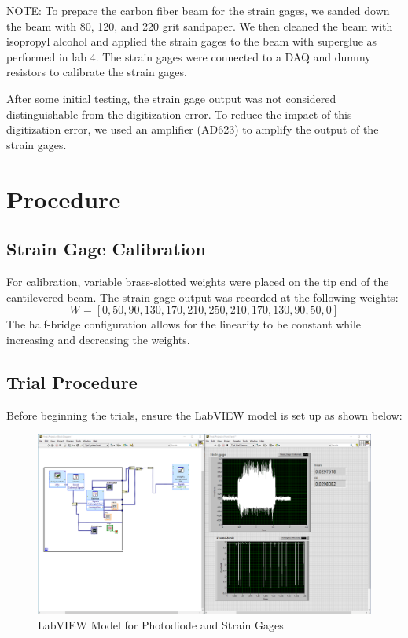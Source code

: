 \documentclass{article}
\begin{document}
\begin{enumerate}
\end{enumerate}

NOTE: To prepare the carbon fiber beam for the strain gages, we sanded down the beam with 80, 120, and 220 grit sandpaper. We then cleaned the beam with isopropyl alcohol and applied the strain gages to the beam with superglue as performed in lab 4. The strain gages were connected to a DAQ and dummy resistors to calibrate the strain gages.
\vspace{1mm}

After some initial testing, the strain gage output was not considered distinguishable from the digitization error. To reduce the impact of this digitization error, we used an amplifier (AD623) to amplify the output of the strain gages.  

\section{Procedure}

\subsection{Strain Gage Calibration}

For calibration, variable brass-slotted weights were placed on the tip end of the cantilevered beam. The strain gage output was recorded at the following weights:
\begin{equation}
    W = [0, 50, 90, 130, 170, 210, 250, 210, 170, 130, 90, 50, 0]
\end{equation}
The half-bridge configuration allows for the linearity to be constant while increasing and decreasing the weights.

\subsection{Trial Procedure}
Before beginning the trials, ensure the LabVIEW model is set up as shown below:

\begin{figure}[H]
  \centering
  \includegraphics[width = \textwidth]{finalprojectimages/labviewfinalprojectmodel.PNG}
  \caption{LabVIEW Model for Photodiode and Strain Gages}
  \label{fig:labviewsetupfinal}
\end{figure}
\end{document}
